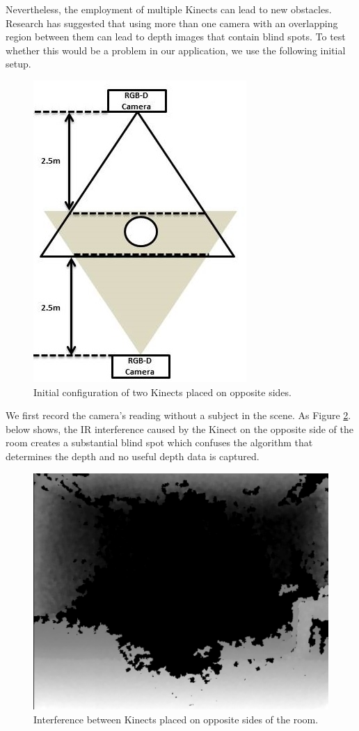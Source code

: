 \documentclass[a4paper]{article}
\begin{document}
Nevertheless, the employment of multiple Kinects can lead to new obstacles. Research has suggested that using more than one camera with an overlapping region between them can lead to depth images that contain blind spots. To test whether this would be a problem in our application, we use the following initial setup.

\begin{figure}[H]
\centering
\includegraphics[scale=0.4]{figure_2cameras_opposite.jpg}
\caption{Initial configuration of two Kinects placed on opposite sides.}
\label{2_cameras_config1}
\end{figure}

We first record the camera's reading without a subject in the scene. As Figure \ref{IR_interference}. below shows, the IR interference caused by the Kinect on the opposite side of the room creates a substantial blind spot which confuses the algorithm that determines the depth and no useful depth data is captured.

\begin{figure}[H]
\centering
\includegraphics[scale=0.2]{IR_Interference2.jpg}
\caption{Interference between Kinects placed on opposite sides of the room.}
\label{IR_interference}
\end{figure}
\end{document}
